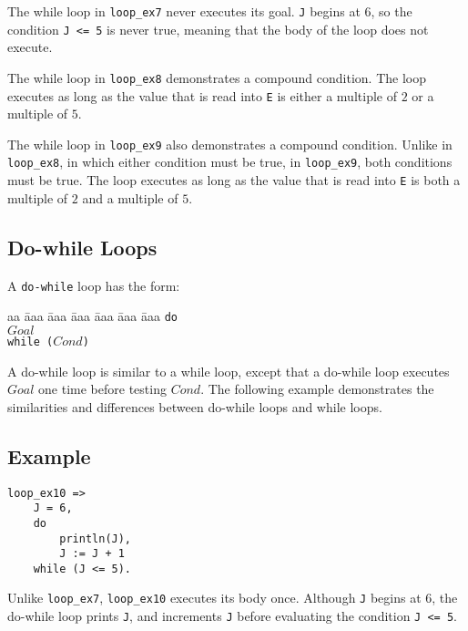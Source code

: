 The while loop in \texttt{loop\_ex7} never executes its goal.  \texttt{J} begins at $6$, so the condition \texttt{J <= 5} is never true, meaning that the body of the loop does not execute.

The while loop in \texttt{loop\_ex8} demonstrates a compound condition.  The loop executes as long as the value that is read into \texttt{E} is either a multiple of $2$ or a multiple of $5$.

The while loop in \texttt{loop\_ex9} also demonstrates a compound condition.  Unlike in \texttt{loop\_ex8}, in which either condition must be true, in \texttt{loop\_ex9}, both conditions must be true.  The loop executes as long as the value that is read into \texttt{E} is both a multiple of $2$ and a multiple of $5$. 

\subsection{Do-while Loops}
A \texttt{do-while} loop has the form:
\begin{tabbing}
aa \= aaa \= aaa \= aaa \= aaa \= aaa \= aaa \kill
\> \texttt{do} \\
\> \> $Goal$  \\
\>  \texttt{while ($Cond$)}
\end{tabbing} 
A do-while loop is similar to a while loop, except that a do-while loop executes $Goal$ one time before testing $Cond$.  The following example demonstrates the similarities and differences between do-while loops and while loops.
\subsection*{Example}
\begin{verbatim}
loop_ex10 =>
    J = 6,
    do
        println(J),
        J := J + 1
    while (J <= 5).
\end{verbatim}

Unlike \texttt{loop\_ex7}, \texttt{loop\_ex10} executes its body once.  Although \texttt{J} begins at $6$, the do-while loop prints \texttt{J}, and increments \texttt{J} before evaluating the condition \texttt{J <= 5}.

